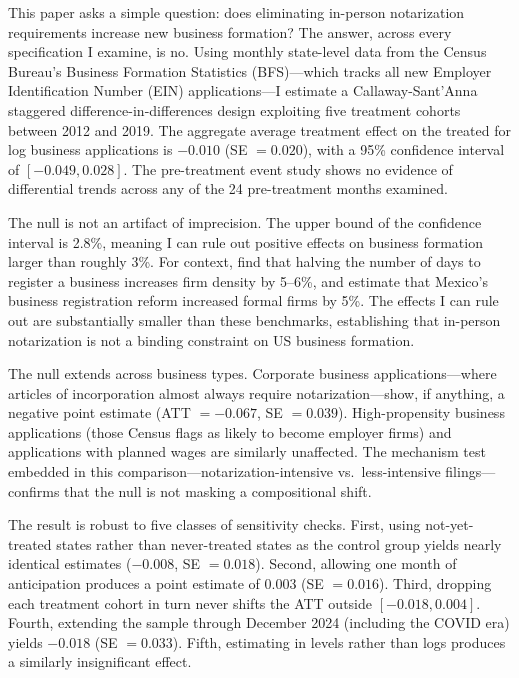 \documentclass[12pt]{article}
\begin{document}
This paper asks a simple question: does eliminating in-person notarization requirements increase new business formation? The answer, across every specification I examine, is no. Using monthly state-level data from the Census Bureau's Business Formation Statistics (BFS)---which tracks all new Employer Identification Number (EIN) applications---I estimate a Callaway-Sant'Anna staggered difference-in-differences design exploiting five treatment cohorts between 2012 and 2019. The aggregate average treatment effect on the treated for log business applications is $-0.010$ (SE $= 0.020$), with a 95\% confidence interval of $[-0.049, 0.028]$. The pre-treatment event study shows no evidence of differential trends across any of the 24 pre-treatment months examined.

The null is not an artifact of imprecision. The upper bound of the confidence interval is 2.8\%, meaning I can rule out positive effects on business formation larger than roughly 3\%. For context, \citet{djankov2002regulation} find that halving the number of days to register a business increases firm density by 5--6\%, and \citet{bruhn2011} estimate that Mexico's business registration reform increased formal firms by 5\%. The effects I can rule out are substantially smaller than these benchmarks, establishing that in-person notarization is not a binding constraint on US business formation.

The null extends across business types. Corporate business applications---where articles of incorporation almost always require notarization---show, if anything, a negative point estimate (ATT $= -0.067$, SE $= 0.039$). High-propensity business applications (those Census flags as likely to become employer firms) and applications with planned wages are similarly unaffected. The mechanism test embedded in this comparison---notarization-intensive vs.\ less-intensive filings---confirms that the null is not masking a compositional shift.

The result is robust to five classes of sensitivity checks. First, using not-yet-treated states rather than never-treated states as the control group yields nearly identical estimates ($-0.008$, SE $= 0.018$). Second, allowing one month of anticipation produces a point estimate of $0.003$ (SE $= 0.016$). Third, dropping each treatment cohort in turn never shifts the ATT outside $[-0.018, 0.004]$. Fourth, extending the sample through December 2024 (including the COVID era) yields $-0.018$ (SE $= 0.033$). Fifth, estimating in levels rather than logs produces a similarly insignificant effect.
\end{document}
